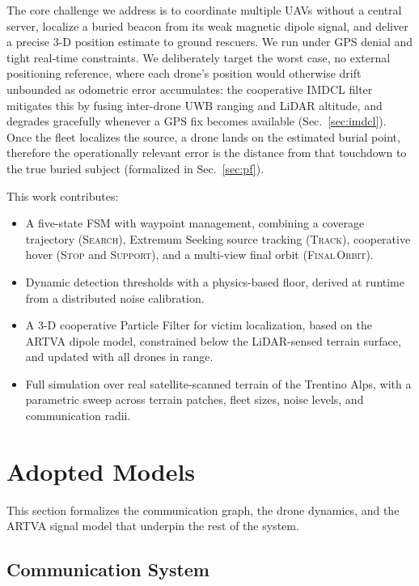 \documentclass[journal,10pt,twocolumn]{IEEEtran}
\begin{document}
The core challenge we address is to coordinate multiple UAVs without a central
server, localize a buried beacon from its weak magnetic dipole signal,
and deliver a precise 3-D position estimate to ground rescuers. We run
under GPS denial and
tight real-time constraints.  
We deliberately target the worst case, no external positioning reference, where
each drone's position would otherwise drift unbounded as odometric error
accumulates: the cooperative IMDCL filter mitigates this by fusing
inter-drone UWB ranging and LiDAR altitude, and degrades gracefully
whenever a GPS fix becomes available (Sec.~\ref{sec:imdcl}). Once the fleet localizes the source, a drone lands on the estimated
burial point, therefore the operationally relevant error is the distance from
that touchdown to the true buried subject (formalized in Sec.~\ref{sec:pf}).

This work contributes:
\begin{itemize}
  \item A five-state FSM with waypoint management,
        combining a coverage trajectory (\textsc{Search}), Extremum
        Seeking source tracking (\textsc{Track}), cooperative hover
        (\textsc{Stop} and \textsc{Support}), and a
        multi-view final orbit (\textsc{Final\,Orbit}).
  \item Dynamic detection thresholds with a physics-based floor,
        derived at runtime from a distributed noise calibration.
  \item A 3-D cooperative Particle Filter for victim localization, based on the ARTVA dipole model,
        constrained below the LiDAR-sensed terrain surface, and updated with all drones in range.
  \item Full simulation over real satellite-scanned terrain of the
        Trentino Alps, with a parametric sweep across terrain patches,
        fleet sizes, noise levels, and communication radii.
\end{itemize}

\section{Adopted Models}
\label{sec:models}

This section formalizes the communication graph, the drone dynamics, and the ARTVA signal model that underpin the rest of the system.

\subsection{Communication System}
\label{sec:comm}
\end{document}
